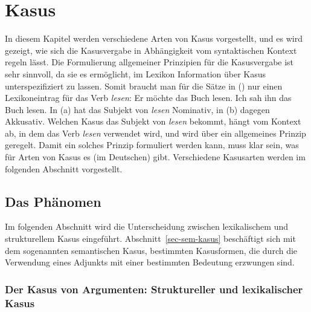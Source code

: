 


\chapter{Kasus}
\label{Kapitel-Kasus}

In diesem Kapitel werden verschiedene Arten von Kasus vorgestellt, und es wird gezeigt,
wie sich die Kasusvergabe in Abhängigkeit vom syntaktischen Kontext regeln lässt.
Die Formulierung allgemeiner Prinzipien für die Kasusvergabe ist sehr sinnvoll,
da sie es ermöglicht, im Lexikon Information über Kasus unterspezifiziert zu lassen.
Somit braucht man für die Sätze in () nur einen Lexikoneintrag für das Verb \emph{lesen}:
\eal
\ex Er möchte das Buch lesen.
\ex Ich sah ihn das Buch lesen.
\zl
In (a) hat das Subjekt von \emph{lesen} Nominativ, in (b) dagegen Akkusativ.
Welchen Kasus das Subjekt von \emph{lesen} bekommt, hängt vom Kontext ab, in dem das
Verb \emph{lesen} verwendet wird, und wird über ein allgemeines Prinzip geregelt. Damit
ein solches Prinzip formuliert werden kann, muss klar sein, was für Arten von Kasus es
(im Deutschen) gibt. Verschiedene Kasusarten werden im folgenden Abschnitt vorgestellt.

\section{Das Phänomen}

Im folgenden Abschnitt wird die Unterscheidung zwischen lexikalischem und strukturellem
Kasus eingeführt. Abschnitt~\ref{sec-sem-kasus} beschäftigt sich mit dem sogenannten
semantischen Kasus, bestimmten Kasusformen, die durch die Verwendung eines Adjunkts
mit einer bestimmten Bedeutung erzwungen sind. 

\subsection{Der Kasus von Argumenten: Struktureller und lexikalischer Kasus}
\label{sec-struk-lex-kas}
\label{sec-struc-lex-kas}
%

